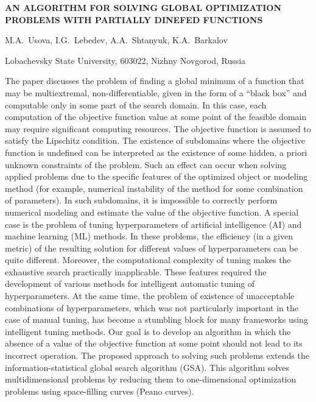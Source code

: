 \documentclass[a4paper,12pt,russian]{article}
\begin{document}
\begin{center}
	\textbf{AN ALGORITHM FOR SOLVING GLOBAL OPTIMIZATION\break
    PROBLEMS WITH PARTIALLY DINEFED FUNCTIONS}
\end{center}

\begin{center}
{M.A.~Usova, I.G.~Lebedev, A.A.~Shtanyuk, K.A.~Barkalov}
\end{center}

\begin{center}
{Lobachevsky State University, 603022, Nizhny Novgorod, Russia}
\end{center}
\begin{small}
The paper discusses the problem of finding a global minimum of a function that may be multiextremal, non-differentiable, given in the form of a ``black box'' and computable only in some part of the search domain. In this case, each computation of the objective function value at some point of the feasible domain may require significant computing resources. The objective function is assumed to satisfy the Lipschitz condition.
The existence of subdomains where the objective function is undefined can be interpreted as the existence of some hidden, a priori unknown constraints of the problem. Such an effect can occur when solving applied problems due to the specific features of the optimized object or modeling method (for example, numerical instability of the method for some combination of parameters). In such subdomains, it is impossible to correctly perform numerical modeling and estimate the value of the objective function. A special case is the problem of tuning hyperparameters of artificial intelligence (AI) and machine learning (ML) methods. In these problems, the efficiency (in a given metric) of the resulting solution for different values of hyperparameters can be quite different. Moreover, the computational complexity of tuning makes the exhaustive search practically inapplicable. These features required the development of various methods for intelligent automatic tuning of hyperparameters. At the same time, the problem of existence of unacceptable combinations of hyperparameters, which was not particularly important in the case of manual tuning, has become a stumbling block for many frameworks using intelligent tuning methods.
Our goal is to develop an algorithm in which the absence of a value of the objective function at some point should not lead to its incorrect operation. The proposed approach to solving such problems extends the information-statistical global search algorithm (GSA). This algorithm solves multidimensional problems by reducing them to one-dimensional optimization problems using space-filling curves (Peano curves).

\end{small}
\end{document}
